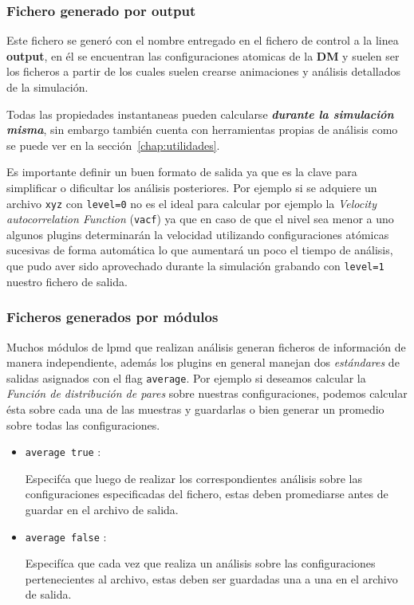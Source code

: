 \subsubsection{Fichero generado por output}
Este fichero se gener\'o con el nombre entregado en el fichero de control a la linea \textbf{output}, en \'el se encuentran las configuraciones atomicas de la \textbf{DM} y suelen ser los ficheros a partir de los cuales suelen crearse animaciones y an\'alisis detallados de la simulaci\'on.

Todas las propiedades instantaneas pueden calcularse \textit{\textbf{durante la simulaci\'on misma}}, sin embargo {\lpmd} tambi\'en cuenta con herramientas propias de an\'alisis como se puede ver en la secci\'on~\ref{chap:utilidades}.

Es importante definir un buen formato de salida ya que es la clave para simplificar o dificultar los an\'alisis posteriores. Por ejemplo si se adquiere un archivo \verb|xyz| con \verb|level=0| no es el ideal para calcular por ejemplo la \textit{Velocity autocorrelation Function} (\verb|vacf|) ya que en caso de que el nivel sea menor a uno algunos plugins determinar\'an la velocidad utilizando configuraciones at\'omicas sucesivas de forma autom\'atica lo que aumentar\'a un poco el tiempo de an\'alisis, que pudo aver sido aprovechado durante la simulaci\'on grabando con \verb|level=1| nuestro fichero de salida.

\subsubsection{Ficheros generados por m\'odulos}
Muchos m\'odulos de lpmd que realizan an\'alisis generan ficheros de informaci\'on de manera independiente, adem\'as los plugins en general manejan dos \textit{est\'andares} de salidas asignados con el flag \verb|average|. Por ejemplo si deseamos calcular la \textit{Funci\'on de distribuci\'on de pares} sobre nuestras configuraciones, podemos calcular \'esta sobre cada una de las muestras y guardarlas o bien generar un promedio sobre todas las configuraciones.

\begin{itemize}
\item \verb|average true| :

Especif\'ca que luego de realizar los correspondientes an\'alisis sobre las configuraciones especificadas del fichero, estas deben promediarse antes de guardar en el archivo de salida.
\item \verb|average false| :

Especif\'ica que cada vez que realiza un an\'alisis sobre las configuraciones pertenecientes al archivo, estas deben ser guardadas una a una en el archivo de salida. 
\end{itemize}
